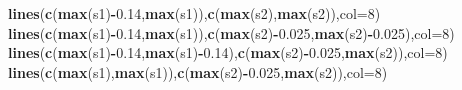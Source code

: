 \documentclass[]{article}
\newenvironment{Shaded}{\begin{snugshade}}{\end{snugshade}}
\newcommand{\DataTypeTok}[1]{\textcolor[rgb]{0.13,0.29,0.53}{#1}}
\newcommand{\DecValTok}[1]{\textcolor[rgb]{0.00,0.00,0.81}{#1}}
\newcommand{\FloatTok}[1]{\textcolor[rgb]{0.00,0.00,0.81}{#1}}
\newcommand{\KeywordTok}[1]{\textcolor[rgb]{0.13,0.29,0.53}{\textbf{#1}}}
\newcommand{\NormalTok}[1]{#1}
\newcommand{\OperatorTok}[1]{\textcolor[rgb]{0.81,0.36,0.00}{\textbf{#1}}}
\begin{document}
\begin{Shaded}
\begin{Highlighting}[]
\KeywordTok{lines}\NormalTok{(}\KeywordTok{c}\NormalTok{(}\KeywordTok{max}\NormalTok{(s1)}\OperatorTok{-}\FloatTok{0.14}\NormalTok{,}\KeywordTok{max}\NormalTok{(s1)),}\KeywordTok{c}\NormalTok{(}\KeywordTok{max}\NormalTok{(s2),}\KeywordTok{max}\NormalTok{(s2)),}\DataTypeTok{col=}\DecValTok{8}\NormalTok{)}
\KeywordTok{lines}\NormalTok{(}\KeywordTok{c}\NormalTok{(}\KeywordTok{max}\NormalTok{(s1)}\OperatorTok{-}\FloatTok{0.14}\NormalTok{,}\KeywordTok{max}\NormalTok{(s1)),}\KeywordTok{c}\NormalTok{(}\KeywordTok{max}\NormalTok{(s2)}\OperatorTok{-}\FloatTok{0.025}\NormalTok{,}\KeywordTok{max}\NormalTok{(s2)}\OperatorTok{-}\FloatTok{0.025}\NormalTok{),}\DataTypeTok{col=}\DecValTok{8}\NormalTok{)}
\KeywordTok{lines}\NormalTok{(}\KeywordTok{c}\NormalTok{(}\KeywordTok{max}\NormalTok{(s1)}\OperatorTok{-}\FloatTok{0.14}\NormalTok{,}\KeywordTok{max}\NormalTok{(s1)}\OperatorTok{-}\FloatTok{0.14}\NormalTok{),}\KeywordTok{c}\NormalTok{(}\KeywordTok{max}\NormalTok{(s2)}\OperatorTok{-}\FloatTok{0.025}\NormalTok{,}\KeywordTok{max}\NormalTok{(s2)),}\DataTypeTok{col=}\DecValTok{8}\NormalTok{)}
\KeywordTok{lines}\NormalTok{(}\KeywordTok{c}\NormalTok{(}\KeywordTok{max}\NormalTok{(s1),}\KeywordTok{max}\NormalTok{(s1)),}\KeywordTok{c}\NormalTok{(}\KeywordTok{max}\NormalTok{(s2)}\OperatorTok{-}\FloatTok{0.025}\NormalTok{,}\KeywordTok{max}\NormalTok{(s2)),}\DataTypeTok{col=}\DecValTok{8}\NormalTok{)}


\end{Highlighting}
\end{Shaded}
\end{document}
